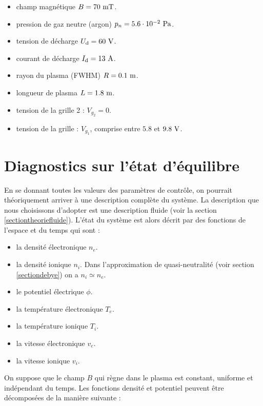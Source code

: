 \documentclass{book}
\begin{document}
\begin{itemize}
\item     champ magn\'etique $B=70\ {\rm mT}$.
\item      pression de gaz neutre (argon)  $p_n=5.6\cdot 10^{-2} \ {\rm Pa}$.
\item      tension de d\'echarge            $U_{\rm d}=60\ {\rm V}$.
\item      courant de d\'echarge           $I_{\rm d}=13\ {\rm A}$.
\item      rayon du plasma (FWHM)          $R=0.1\ {\rm m}$.
\item      longueur de plasma               $L=1.8\ {\rm m}$.
\item tension de la grille 2 : $V_{g_2}=0$.
\item tension de la grille  : $V_{g_1}$, comprise entre $5.8$ et
$9.8\ {\rm V}$.
\end{itemize}






\section{Diagnostics sur l'\'etat d'\'equilibre}\label{sectionetat}
En se donnant toutes les valeurs des param\`etres de contr\^ole, on
pourrait 
th\'eoriquement arriver \`a une description compl\`ete du syst\`eme. La
description que nous choisissons d'adopter est une description
fluide 
(voir la section \ref{sectiontheoriefluide}).
L'\'etat du syst\`eme est alors d\'ecrit par des fonctions de l'espace
et du temps qui sont :
\begin{itemize}
\item la densit\'e \'electronique $n_e$.
\item  la densit\'e ionique $n_i$. Dans l'approximation de
quasi-neutralit\'e (voir section \ref{sectiondebye}) on a $n_i\simeq n_e$.
\item le potentiel \'electrique $\phi$.
\item la temp\'erature \'electronique $T_e$.
\item  la temp\'erature ionique  $T_i$.
\item la vitesse \'electronique $v_e$.
\item la vitesse  ionique  $v_i$.
\end{itemize}

On suppose que le champ $B$ qui r\`egne dans le plasma est
constant, uniforme et ind\'ependant du temps.
Les fonctions densit\'e et potentiel
peuvent
\^etre d\'ecompos\'ees de la mani\`ere suivante :
\end{document}
